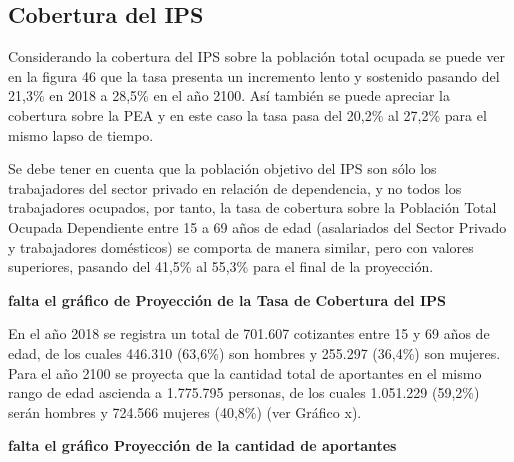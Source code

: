 \documentclass[a4paper,11pt]{article}
\begin{document}
\newpage

\newpage

\newpage

\newpage

\newpage

\newpage

\newpage

\newpage

\newpage

\newpage

\newpage

\newpage
%
%
%
%
%












\subsection{Cobertura del IPS}

Considerando la cobertura del IPS sobre la población total ocupada se puede ver en la figura 46 que la tasa presenta un incremento lento y sostenido pasando del 21,3\% en 2018 a 28,5\% en el año 2100.  Así también se puede apreciar la cobertura sobre la PEA y en este caso la tasa pasa del 20,2\% al 27,2\% para el mismo lapso de tiempo.

Se debe tener en cuenta que la población objetivo del IPS son sólo los trabajadores del sector privado en relación de dependencia, y no todos los trabajadores ocupados, por tanto, la tasa de cobertura sobre la Población Total Ocupada Dependiente entre 15 a 69 años de edad (asalariados del Sector Privado y trabajadores domésticos) se comporta de manera similar, pero con valores superiores, pasando del 41,5\% al 55,3\% para el final de la proyección.

\textbf{falta el gráfico de Proyección de la Tasa de Cobertura del IPS}

En el año 2018 se registra un total de 701.607 cotizantes entre 15 y 69 años de edad, de los cuales 446.310 (63,6\%) son hombres y 255.297 (36,4\%) son mujeres. Para el año 2100 se proyecta que la cantidad total de aportantes en el mismo rango de edad ascienda a 1.775.795 personas, de los cuales 1.051.229 (59,2\%) serán hombres y 724.566 mujeres (40,8\%) (ver Gráfico x).

\textbf{falta el gráfico Proyección de la cantidad de aportantes}
\end{document}
